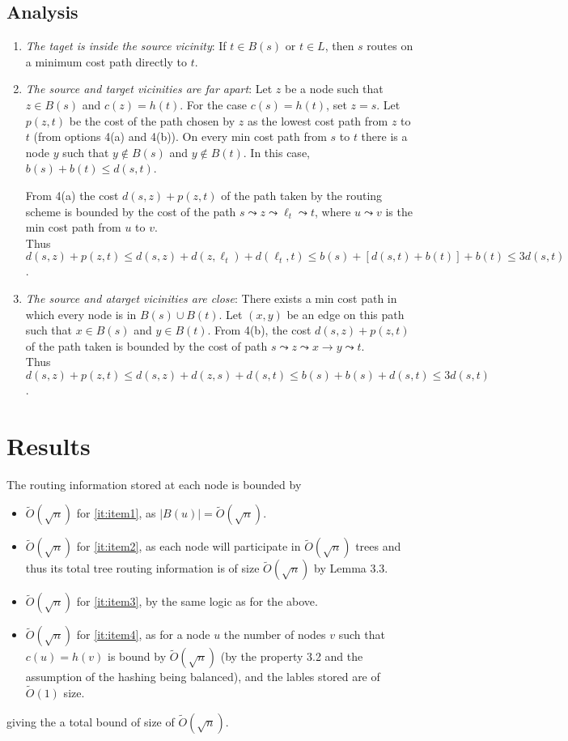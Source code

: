 \subsection{Analysis}
\begin{enumerate}
    \item \textit{The taget is inside the source vicinity}: If $t\in B(s)$ or $t\in L$, then $s$ routes on a minimum cost path directly to $t$.
    \item \textit{The source and target vicinities are far apart}: Let $z$ be a node such that $z\in B(s)$ and $c(z)=h(t)$. For the case $c(s)=h(t)$, set $z=s$. Let $p(z,t)$ be the cost of the path chosen by $z$ as the lowest cost   path from $z$ to $t$ (from options 4(a) and 4(b)).
    On every min cost path from $s$ to $t$ there is a node $y$ such that $y\not\in B(s)$ and $y\not\in B(t)$. In this case, $b(s)+b(t)\leq d(s,t)$.

    From 4(a) the cost $d(s,z)+p(z, t)$ of the path taken by the routing scheme is bounded by the cost of the path $s\leadsto z\leadsto \ell_t\leadsto t$, where $u\leadsto v$ is the min cost path from $u$ to $v$.\\
    Thus $d(s,z)+p(z,t) \leq d(s,z)+d(z,\ell_t)+d(\ell_t,t) \leq b(s) + [d(s,t) + b(t)] + b(t) \leq 3d(s,t)$.
    \item \textit{The source and atarget vicinities are close}: There exists a min cost path in which every node is in $B(s)\cup B(t)$. Let $(x,y)$ be an edge on this path such that $x\in B(s)$ and $y\in B(t)$. From 4(b), the cost $d(s,z)+p(z,t)$ of the path taken is bounded by the cost of path $s\leadsto z\leadsto x\rightarrow y \leadsto t$.\\
    Thus $d(s,z)+p(z,t) \leq d(s,z) + d(z,s) + d(s,t) \leq b(s)+b(s)+d(s,t)\leq 3d(s,t)$.
\end{enumerate}


\section{Results}
The routing information stored at each node is bounded by
\begin{itemize}
    \item $\tilde{O}(\sqrt{n})$ for \ref{it:item1}, as $|B(u)| = \tilde{O}(\sqrt{n})$.
    \item $\tilde{O}(\sqrt{n})$ for \ref{it:item2}, as each node will participate in $\tilde{O}(\sqrt{n})$ trees and thus its total tree routing information is of size $\tilde{O}(\sqrt{n})$ by Lemma 3.3.
    \item $\tilde{O}(\sqrt{n})$ for \ref{it:item3}, by the same logic as for the above.
    \item $\tilde{O}(\sqrt{n})$ for \ref{it:item4}, as for a node $u$ the number of nodes $v$ such that $c(u) = h(v)$ is bound by $\tilde{O}(\sqrt{n})$ (by the property 3.2 and the assumption of the hashing being balanced), and the lables stored are of $\tilde{O}(1)$ size.
\end{itemize}
giving the a total bound of size of $\tilde{O}(\sqrt{n})$.

